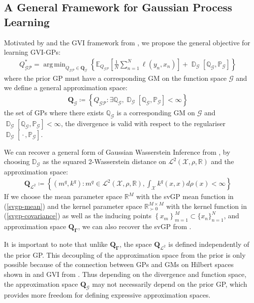 \documentclass{article}
\newcommand{\D}{\operatorname{\mathbb{D}}}
\newcommand{\GP}{\operatorname{\mathcal{GP}}}
\newcommand{\wc}{\operatorname{{}\cdot{}}}
\DeclareMathOperator*{\argmin}{arg\,min}
\numberwithin{equation}{section}
\begin{document}
\subsection{A General Framework for Gaussian Process Learning}
Motivated by \cite{wild2022generalized} and the GVI framework from \cite{knoblauch2022optimization}, we propose the general objective for learning GVI-GPs:
\begin{align}
Q_{\GP}^* = \argmin_{Q_{\GP} \in \boldsymbol{Q}_{\mathcal{G}}} \left\{ \mathbb{E}_{Q_{\GP}}\left[\frac{1}{N}\sum_{n=1}^N \ell(y_n, x_n)\right] + \D_{\mathcal{G}}\left[\mathbb{Q}_{\mathcal{G}}, \mathbb{P}_{\mathcal{G}}\right]\right\}
\label{gvi-gp-objective}
\end{align}
where the prior GP must have a corresponding GM on the function space $\mathcal{G}$ and we define a general approximation space:
\begin{align}
    \boldsymbol{Q}_{\mathcal{G}} \coloneqq \left\{
    Q_{\GP} :  \exists \mathbb{Q}_{\mathcal{G}},  \D_{\mathcal{G}}\left[\mathbb{Q}_{\mathcal{G}}, \mathbb{P}_{\mathcal{G}}\right] < \infty
    \right\}
\end{align}
the set of GPs where there exists $\mathbb{Q}_{\mathcal{G}}$ is a corresponding GM on $\mathcal{G}$ and $\D_{\mathcal{G}}\left[\mathbb{Q}_{\mathcal{G}}, \mathbb{P}_{\mathcal{G}}\right] < \infty$, the divergence is valid with respect to the regulariser $\D_{\mathcal{G}}[\wc, \mathbb{P}_{\mathcal{G}}]$.

We can recover a general form of Gaussian Wasserstein Inference from \cite{wild2022generalized}, by choosing $\mathbb{D}_{\mathcal{G}}$ as the squared 2-Wasserstein distance on $\mathcal{L}^2(\mathcal{X}, \rho, \mathbb{R})$ and the approximation space:
\begin{align}
    \boldsymbol{Q}_{\mathcal{L}^2} \coloneqq \left\{
    \left(m^q, k^q\right): m^q \in \mathcal{L}^2(\mathcal{X}, \rho, \mathbb{R}), \int_{\mathcal{X}} k^q(x, x)d\rho(x) < \infty
    \right\}
\end{align}
If we choose the mean parameter space $\mathbb{R}^M$ with the svGP mean function in (\ref{svgp-mean}) and the kernel parameter space $\mathbb{R}^{M\times M}_{\succ 0}$ with the kernel function in (\ref{svgp-covariance}) as well as the inducing points $\left\{x_m\right\}_{m=1}^{M} \subset \{x_n\}_{n=1}^{N}$, and approximation space $\boldsymbol{Q}_{\boldsymbol{\Gamma}}$, we can also recover the svGP from \cite{titsias2009variational}.

It is important to note that unlike $\boldsymbol{Q}_{\boldsymbol{\Gamma}}$, the space $\boldsymbol{Q}_{\mathcal{L}^2}$ is defined independently of the prior GP. This decoupling of the approximation space from the prior is only possible because of the connection between GPs and GMs on Hilbert spaces shown in \cite{wild2022generalized} and GVI from \cite{knoblauch2022optimization}. Thus depending on the divergence and function space, the approximation space $\boldsymbol{Q}_{\mathcal{G}}$ may not necessarily depend on the prior GP, which provides more freedom for defining expressive approximation spaces.
\end{document}
